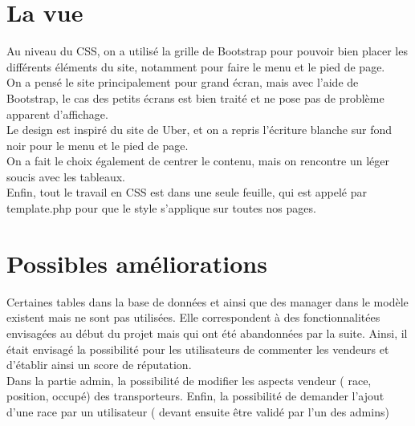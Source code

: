 \documentclass{article}
\begin{document}
\section{La vue}
Au niveau du CSS, on a utilisé la grille de Bootstrap pour pouvoir bien placer les différents éléments du site, notamment pour faire le menu et le pied de page.\\
On a pensé le site principalement pour grand écran, mais avec l'aide de Bootstrap, le cas des petits écrans est bien traité et ne pose pas de problème apparent d'affichage.\\
Le design est inspiré du site de Uber, et on a repris l'écriture blanche sur fond noir pour le menu et le pied de page.\\
On a fait le choix également de centrer le contenu, mais on rencontre un léger soucis avec les tableaux.\\
Enfin, tout le travail en CSS est dans une seule feuille, qui est appelé par template.php pour que le style s'applique sur toutes nos pages. 

\section{Possibles améliorations}
Certaines tables dans la base de données et ainsi que des manager dans le modèle existent mais ne sont pas utilisées. 
Elle correspondent à des fonctionnalitées envisagées au début du projet mais qui ont été abandonnées par la suite. 
Ainsi, il était envisagé la possibilité pour les utilisateurs de commenter les vendeurs et d'établir ainsi un score de réputation. 
\\
Dans la partie admin, la possibilité de modifier les aspects vendeur ( race, position, occupé) des transporteurs. 
Enfin, la possibilité de demander l'ajout d'une race par un utilisateur ( devant ensuite être validé par l'un des admins)
\end{document}
